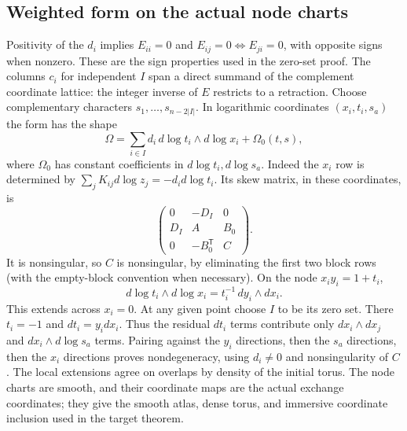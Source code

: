 \documentclass[11pt,a4paper]{article}
\begin{document}
\subsection*{Weighted form on the actual node charts}
Positivity of the $d_i$ implies $E_{ii}=0$ and
$E_{ij}=0\Longleftrightarrow E_{ji}=0$, with opposite signs when nonzero.
These are the sign properties used in the zero-set proof.
The columns $c_i$ for independent $I$ span a direct summand of the
complement coordinate lattice: the integer inverse of $E$ restricts to
a retraction. Choose complementary characters $s_1,\ldots,s_{n-2|I|}$.
In logarithmic coordinates $(x_i,t_i,s_a)$ the form has the shape
\[
 \Omega=\sum_{i\in I}d_i\,d\log t_i\wedge d\log x_i
       +\Omega_0(t,s),
\]
where $\Omega_0$ has constant coefficients in $d\log t_i,d\log s_a$.
Indeed the $x_i$ row is determined by
$\sum_jK_{ij}d\log z_j=-d_i d\log t_i$.
Its skew matrix, in these coordinates, is
\[
 \begin{pmatrix}0&-D_I&0\\D_I&A&B_0\\0&-B_0^{\mathsf T}&C\end{pmatrix}.
\]
It is nonsingular, so $C$ is nonsingular, by eliminating the first two
block rows (with the empty-block convention when necessary).
On the node $x_i y_i=1+t_i$,
\[
 d\log t_i\wedge d\log x_i=t_i^{-1}\,dy_i\wedge dx_i.
\]
This extends across $x_i=0$. At any given point choose $I$ to be its
zero set. There $t_i=-1$ and $dt_i=y_i dx_i$. Thus the residual
$dt_i$ terms contribute only $dx_i\wedge dx_j$ and
$dx_i\wedge d\log s_a$ terms. Pairing against the $y_i$ directions,
then the $s_a$ directions, then the $x_i$ directions proves
nondegeneracy, using $d_i\ne0$ and nonsingularity of $C$.
The local extensions agree on overlaps by density of the initial torus.
The node charts are smooth, and their coordinate maps are the actual
exchange coordinates; they give the smooth atlas, dense torus, and
immersive coordinate inclusion used in the target theorem.
\end{document}
